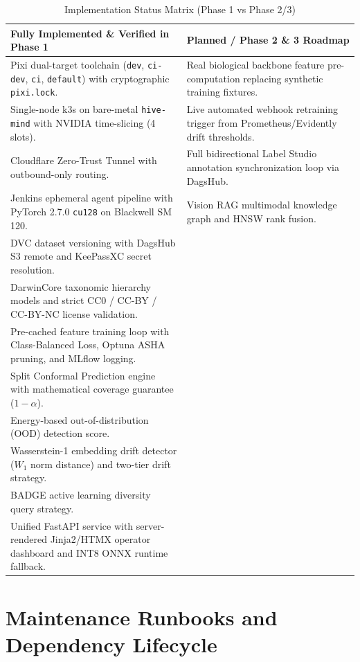 \begin{table}[htbp]
\centering
\caption{Implementation Status Matrix (Phase 1 vs Phase 2/3)}
\label{tab:implementation_status}
\begin{tabularx}{\textwidth}{@{}X X@{}}
\toprule
\textbf{Fully Implemented \& Verified in Phase 1} & \textbf{Planned / Phase 2 \& 3 Roadmap} \\ \midrule
Pixi dual-target toolchain (\texttt{dev}, \texttt{ci-dev}, \texttt{ci}, \texttt{default}) with cryptographic \texttt{pixi.lock}. & Real biological backbone feature pre-computation replacing synthetic training fixtures. \\ \addlinespace
Single-node k3s on bare-metal \texttt{hive-mind} with NVIDIA time-slicing (4 slots). & Live automated webhook retraining trigger from Prometheus/Evidently drift thresholds. \\ \addlinespace
Cloudflare Zero-Trust Tunnel with outbound-only routing. & Full bidirectional Label Studio annotation synchronization loop via DagsHub. \\ \addlinespace
Jenkins ephemeral agent pipeline with PyTorch 2.7.0 \texttt{cu128} on Blackwell SM 120. & Vision RAG multimodal knowledge graph and HNSW rank fusion. \\ \addlinespace
DVC dataset versioning with DagsHub S3 remote and KeePassXC secret resolution. & \\ \addlinespace
DarwinCore taxonomic hierarchy models and strict CC0 / CC-BY / CC-BY-NC license validation. & \\ \addlinespace
Pre-cached feature training loop with Class-Balanced Loss, Optuna ASHA pruning, and MLflow logging. & \\ \addlinespace
Split Conformal Prediction engine with mathematical coverage guarantee ($1 - \alpha$). & \\ \addlinespace
Energy-based out-of-distribution (OOD) detection score. & \\ \addlinespace
Wasserstein-1 embedding drift detector ($W_1$ norm distance) and two-tier drift strategy. & \\ \addlinespace
BADGE active learning diversity query strategy. & \\ \addlinespace
Unified FastAPI service with server-rendered Jinja2/HTMX operator dashboard and INT8 ONNX runtime fallback. & \\ \bottomrule
\end{tabularx}
\end{table}

\section{Maintenance Runbooks and Dependency Lifecycle}
\label{sec:maintenance_runbooks}

